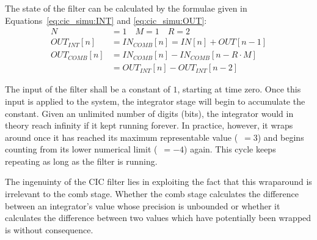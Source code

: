 The  state  of  the  filter  can  be  calculated  by  the  formulae  given  in
Equations~\ref{eq:cic_simu:INT} and \ref{eq:cic_simu:OUT}:
\begin{align}
    N             & = 1 \quad M = 1 \quad R=2\nonumber\\     
    OUT_{INT}[n]  & = IN_{COMB}[n] = IN[n]        + OUT[n-1] 
    \label{eq:cic_simu:INT} \\
    OUT_{COMB}[n] & = IN_{COMB}[n] - IN_{COMB}[n-R\cdot M] 
    \nonumber\\
                  & = OUT_{INT}[n] - OUT_{INT}[n-2] 
    \label{eq:cic_simu:OUT}
\end{align}

The  input  of the  filter  shall  be a  constant  of  $1$, starting  at  time
zero. Once this  input is  applied to  the system,  the integrator  stage will
begin  to  accumulate  the  constant. Given  an  unlimited  number  of  digits
(bits),  the integrator  would in  theory reach  infinity if  it kept  running
forever. In practice, however, it wraps around once it has reached its maximum
representable value  (~$ =  3$) and begins  counting from  its lower
numerical limit  (~$=-4$) again. This cycle keeps  repeating as long
as the filter is running.

The  ingenuinty of  the  CIC filter  lies  in exploiting  the  fact that  this
wraparound is irrelevant to the  comb stage. Whether the comb stage calculates
the difference between  an integrator's value whose precision  is unbounded or
whether it calculates the difference between two values which have potentially
been  wrapped  is  without  consequence.

